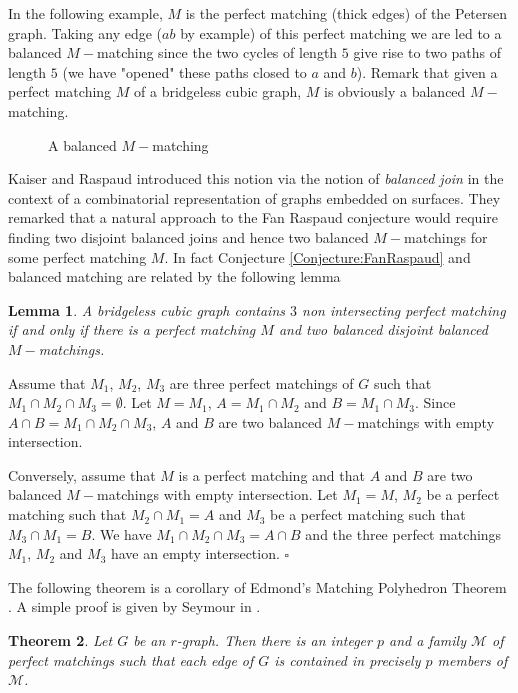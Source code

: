 \documentclass{elsart}
\theoremstyle{plain} \theoremheaderfont{\scshape}
\newtheorem{Thm}{\bf Theorem}
\newtheorem{Lem}[Thm]{\bf Lemma}
\newenvironment{Prf}{{\bf \noindent Proof } }{\hfill$\square$\\}
\begin{document}
In the following example, $M$ is the perfect matching (thick edges)
of the Petersen graph. Taking any edge ($ab$ by example) of this
perfect matching we are led to a balanced $M-$matching since the two
cycles of length $5$ give rise to two paths of length $5$ (we have
"opened" these paths closed to $a$ and $b$). Remark that given a
perfect matching $M$ of a bridgeless cubic graph, $M$ is obviously a
balanced $M-$matching.


\begin{figure}[t]
\centering {} \hsize \noindent {}
\caption{A balanced $M-$matching} \label{Figure:Petersen}
\end{figure}

Kaiser and Raspaud \cite{KaiRas} introduced this notion via the
notion of {\em balanced join} in  the context of a combinatorial
representation of graphs embedded on surfaces. They remarked that a
natural approach to the Fan Raspaud conjecture would require finding
two disjoint balanced joins and hence two balanced $M-$matchings for
some perfect matching $M$. In fact  Conjecture
\ref{Conjecture:FanRaspaud} and balanced matching are related by the
following lemma

\begin{Lem}\label{Lemma:FondamentalDisjointsBalanced}
A bridgeless cubic graph contains $3$ non intersecting perfect
matching if and only if there is a perfect matching $M$ and two
balanced disjoint balanced $M-$matchings.
\end{Lem}
\begin{Prf} Assume that $M_1$, $M_2$, $M_3$ are three perfect
matchings of $G$ such that $M_1 \cap M_2 \cap M_3 = \emptyset$. Let
$M=M_1$, $A=M_1 \cap M_2$ and $B=M_1 \cap M_3$. Since $A\cap B=M_1
\cap M_2 \cap M_3$, $A$ and $B$ are two balanced $M-$matchings with
empty intersection.

Conversely, assume that $M$ is a perfect matching and that $A$ and
$B$ are two balanced $M-$matchings with empty intersection. Let
$M_1=M$, $M_2$ be a perfect matching such that $M_2 \cap M_1=A$
 and $M_3$ be a perfect
matching such that $M_3 \cap M_1=B$. We have $M_1 \cap M_2 \cap
M_3=A \cap B$ and the three perfect matchings $M_1$, $M_2$ and $M_3$
have an empty intersection.
\end{Prf}

 The following theorem is a corollary of Edmond's Matching Polyhedron
Theorem \cite{Edm}. A simple proof is given by Seymour in
\cite{Sey}.

\begin{Thm} \label{Theorem:EdmondsSeymour} Let $G$ be an $r$-graph. Then there is an integer $p$
and a family $\mathcal M$ of perfect matchings such that each edge
of $G$ is contained in precisely $p$ members of $\mathcal M$.
\end{Thm}
\end{document}
